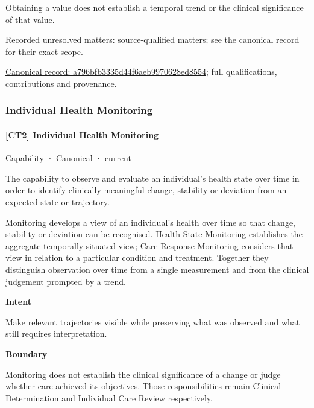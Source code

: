 Obtaining a value does not establish a temporal trend or the clinical significance of that value.


{\small Recorded unresolved matters: source-qualified matters; see the canonical record for their exact scope.}\par
{\footnotesize \href{../../../../continuum/strategy/capability/a796bfb3335d44f6aeb9970628ed8554.md}{Canonical record: a796bfb3335d44f6aeb9970628ed8554}; full qualifications, contributions and provenance.}\par
\subsubsection{Individual Health Monitoring}

\paragraph{[CT2] Individual Health Monitoring}

\label{element:c7d0e498e1ad44138df940af2f91cd2d}
{\small Capability · Canonical · current}\par

The capability to observe and evaluate an individual's health state over time in order to identify clinically meaningful change, stability or deviation from an expected state or trajectory.



Monitoring develops a view of an individual's health over time so that change, stability or deviation can be recognised. Health State Monitoring establishes the aggregate temporally situated view; Care Response Monitoring considers that view in relation to a particular condition and treatment. Together they distinguish observation over time from a single measurement and from the clinical judgement prompted by a trend.



\textbf{Intent}



Make relevant trajectories visible while preserving what was observed and what still requires interpretation.



\textbf{Boundary}



Monitoring does not establish the clinical significance of a change or judge whether care achieved its objectives. Those responsibilities remain Clinical Determination and Individual Care Review respectively.


